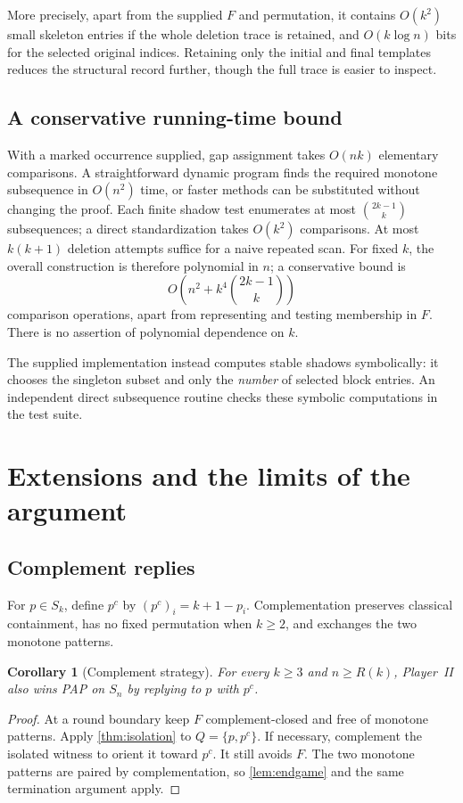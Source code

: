 \documentclass[11pt,a4paper]{article}
\newtheorem{corollary}[theorem]{Corollary}
\theoremstyle{definition}
\theoremstyle{remark}
\newcommand{\replybound}{R(k)}
\begin{document}
More precisely, apart from the supplied $F$ and permutation, it contains
$O(k^2)$ small skeleton entries if the whole deletion trace is retained,
and $O(k\log n)$ bits for the selected original indices. Retaining only the
initial and final templates reduces the structural record further, though
the full trace is easier to inspect.

\subsection{A conservative running-time bound}
With a marked occurrence supplied, gap assignment takes $O(nk)$ elementary
comparisons. A straightforward dynamic program finds the required monotone
subsequence in $O(n^2)$ time, or faster methods can be substituted without
changing the proof. Each finite shadow test enumerates at most
$\binom{2k-1}{k}$ subsequences; a direct standardization takes $O(k^2)$
comparisons. At most $k(k+1)$ deletion attempts suffice for a naive repeated
scan. For fixed $k$, the overall construction is therefore polynomial in
$n$; a conservative bound is
\[
 O\!\left(n^2+k^4\binom{2k-1}{k}\right)
\]
comparison operations, apart from representing and testing membership in
$F$. There is no assertion of polynomial dependence on $k$.

The supplied implementation instead computes stable shadows symbolically:
it chooses the singleton subset and only the \emph{number} of selected
block entries. An independent direct subsequence routine checks these
symbolic computations in the test suite.

\section{Extensions and the limits of the argument}
\label{sec:extensions}

\subsection{Complement replies}
For $p\in S_k$, define $p^c$ by $(p^c)_i=k+1-p_i$. Complementation preserves
classical containment, has no fixed permutation when $k\ge2$, and exchanges
the two monotone patterns.

\begin{corollary}[Complement strategy]\label{cor:complement}
For every $k\ge3$ and $n\ge\replybound$, Player~II also wins PAP on $S_n$ by
replying to $p$ with $p^c$.
\end{corollary}
\begin{proof}
At a round boundary keep $F$ complement-closed and free of monotone
patterns. Apply \cref{thm:isolation} to $Q=\{p,p^c\}$. If necessary,
complement the isolated witness to orient it toward $p^c$. It still avoids
$F$. The two monotone patterns are paired by complementation, so
\cref{lem:endgame} and the same termination argument apply.
\end{proof}
\end{document}
